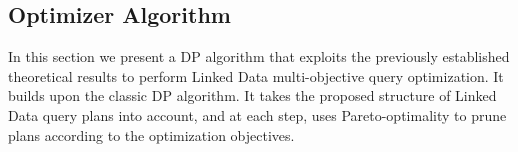 
\subsection{Optimizer Algorithm}

In this section we present a DP algorithm that exploits the previously established theoretical results to perform Linked Data multi-objective query optimization. It builds upon the classic DP algorithm. It takes the proposed structure of Linked Data query plans into account, and at each step, uses Pareto-optimality to prune
plans according to the optimization objectives.






